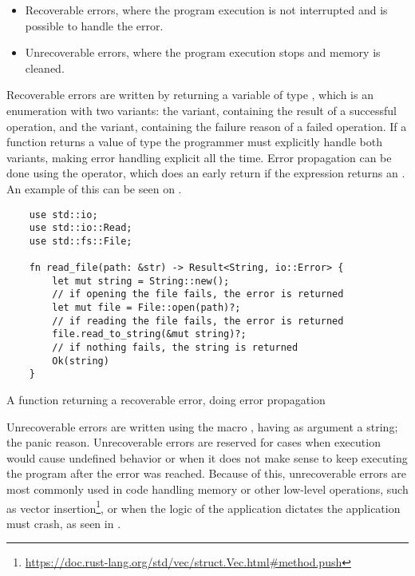\begin{itemize}
    \item Recoverable errors, where the program execution is not interrupted and
        is possible to handle the error.
    \item Unrecoverable errors, where the program execution stops and memory is
        cleaned.
\end{itemize}

Recoverable errors are written by returning a variable of type , which is an enumeration with two variants: the 
variant, containing the result of a successful operation, and the 
variant, containing the failure reason of a failed operation. If a function
returns a value of type  the programmer must explicitly
handle both variants, making error handling explicit all the time. Error
propagation can be done using the  operator, which does an early
return if the expression returns an . An example of this can be
seen on .

\begin{listing}[h]
	\begin{verbatim}
    use std::io;
    use std::io::Read;
    use std::fs::File;

    fn read_file(path: &str) -> Result<String, io::Error> {
        let mut string = String::new();
        // if opening the file fails, the error is returned
        let mut file = File::open(path)?;
        // if reading the file fails, the error is returned
        file.read_to_string(&mut string)?;
        // if nothing fails, the string is returned
        Ok(string)
    }
    \end{verbatim}
  \caption{A function returning a recoverable error, doing error propagation}
  \label{lst:recoverable_error}
\end{listing}

Unrecoverable errors are written using the macro , having as
argument a string; the panic reason. Unrecoverable errors are reserved for
cases when execution would cause undefined behavior or when it does not make
sense to keep executing the program after the error was reached. Because of
this, unrecoverable errors are most commonly used in code handling memory or
other low-level operations, such as vector
insertion\footnote{\url{https://doc.rust-lang.org/std/vec/struct.Vec.html\#method.push}},
or when the logic of the application dictates the application must crash, as
seen in .


